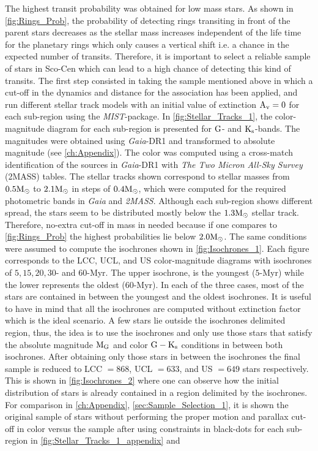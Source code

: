 The highest transit probability was obtained for low mass stars. As shown in \autoref{fig:Rings_Prob}, the probability of detecting rings transiting in front of the parent stars decreases as the stellar mass increases independent of the life time for the planetary rings which only causes a vertical shift i.e. a chance in the expected number of transits. Therefore, it is important to select a reliable sample of stars in Sco-Cen which can lead to a high chance of detecting this kind of transits. The first step consisted in taking the sample mentioned above in which a cut-off in the dynamics and distance for the association has been applied, and run different stellar track models with an initial value of extinction $\textnormal{A}_\textnormal{v} = 0$ for each sub-region using the \textit{MIST}-package. In \autoref{fig:Stellar_Tracks_1}, the color-magnitude diagram for each sub-region is presented for $\textnormal{G}$- and $\textnormal{K}_\textnormal{s}$-bands. The magnitudes were obtained using \textit{Gaia}-DR1 and transformed to absolute magnitude (see \autoref{ch:Appendix}). The color was computed using a cross-match identification of the sources in \textit{Gaia}-DR1 with \textit{The Two Micron All-Sky Survey} (2MASS) tables. The stellar tracks shown correspond to stellar masses from $0.5 \textnormal{M}_\odot$ to  $2.1 \textnormal{M}_\odot$ in steps of $0.4 \textnormal{M}_\odot$, which were computed for the required photometric bands in \textit{Gaia} and \textit{2MASS}. Although each sub-region shows different spread, the stars seem to be distributed mostly below the $1.3 \textnormal{M}_\odot$ stellar track. Therefore, no-extra cut-off in mass in needed because if one compares to \autoref{fig:Rings_Prob} the highest probabilities lie below $2.0 \textnormal{M}_\odot$. The same conditions were assumed to compute the isochrones shown in \autoref{fig:Isochrones_1}. Each figure corresponds to the LCC, UCL, and US color-magnitude diagrams with isochrones of $5, 15, 20, 30$- and $60$-Myr. The upper isochrone, is the youngest ($5$-Myr) while the lower represents the oldest ($60$-Myr). In each of the three cases, most of the stars are contained in between the youngest and the oldest isochrones. It is useful to have in mind that all the isochrones are computed without extinction factor which is the ideal scenario. A few stars lie outside the isochrones delimited region, thus, the idea is to use the isochrones and only use those stars that satisfy the absolute magnitude $\textnormal{M}_\textnormal{G}$ and color $\textnormal{G} - \textnormal{K}_\textnormal{s}$ conditions in between both isochrones. After obtaining only those stars in between the isochrones the final sample is reduced to LCC $= 868$, UCL $= 633$, and US $= 649$ stars respectively. This is shown in \autoref{fig:Isochrones_2} where one can observe how the initial distribution of stars is already contained in a region delimited by the isochrones. For comparison in \autoref{ch:Appendix}, \autoref{sec:Sample_Selection_1}, it is shown the original sample of stars without performing the proper motion and parallax cut-off in color versus the sample after using \citeyear{2016MNRAS.461..794P} constraints in black-dots for each sub-region in \autoref{fig:Stellar_Tracks_1_appendix} and 
